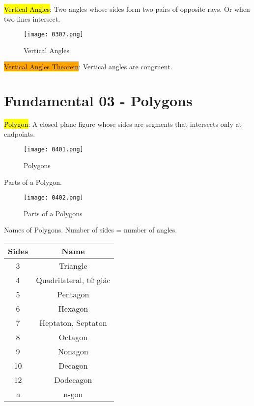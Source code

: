 \vspace{1 cm}

\hl{Vertical Angles}: Two angles whose sides form two pairs of opposite rays. Or when two lines intersect.

\begin{figure}[htb!]
  \centering
  \texttt{[image: 0307.png]}
  \caption{Vertical Angles}
\end{figure}

\begin{tcolorbox}[colback=red!5!white,colframe=red!75!black]
  \colorbox{Orange}{Vertical Angles Theorem}: Vertical angles are congruent.
\end{tcolorbox}

\section{Fundamental 03 - Polygons}

\newpage

\hl{Polygon}: A closed plane figure whose sides are segments that intersects only at endpoints.

\begin{figure}[htb!]
  \centering
  \texttt{[image: 0401.png]}
  \caption{Polygons}
\end{figure}

Parts of a Polygon.

\begin{figure}[htb!]
  \centering
  \texttt{[image: 0402.png]}
  \caption{Parts of a Polygons}
\end{figure}

\newpage

Names of Polygons. Number of sides = number of angles.

\begin{center}
\begin{tabular}{ c | c }
  \textbf{Sides} & \textbf{Name} \\
  \hline
  3 & Triangle \\
  4 & Quadrilateral, tứ giác \\
  5 & Pentagon \\
  6 & Hexagon \\
  7 & Heptaton, Septaton \\
  8 & Octagon \\
  9 & Nonagon \\
  10 & Decagon \\
  12 & Dodecagon \\
  n & n-gon \\
\end{tabular}
\end{center}

